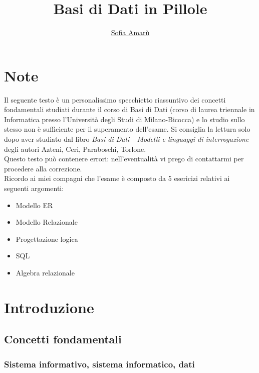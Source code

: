 \documentclass[a4paper]{article}
\begin{document}
\title{Basi di Dati in Pillole}
\author{\href{https://t.me/amarusofia}{Sofia Amarù}}
\maketitle
\tableofcontents

\section*{Note}
Il seguente testo è un personalissimo specchietto riassuntivo dei concetti fondamentali studiati durante il corso di Basi di Dati (corso di laurea triennale in Informatica presso l'Università degli Studi di Milano-Bicocca) e lo studio sullo stesso non è sufficiente per il superamento dell'esame. Si consiglia la lettura solo dopo aver studiato dal libro \emph{Basi di Dati - Modelli e linguaggi di interrogazione} degli autori Azteni, Ceri, Paraboschi, Torlone.\medskip\\
Questo testo può contenere errori: nell'eventualità vi prego di contattarmi per procedere alla correzione.\medskip\\
%
Ricordo ai miei compagni che l'esame è composto da 5 esericizi relativi ai seguenti argomenti:
\begin{itemize}[leftmargin=*, noitemsep]
  \item Modello ER
  \item Modello Relazionale
  \item Progettazione logica
  \item SQL
  \item Algebra relazionale
\end{itemize}

\section{Introduzione}
\subsection{Concetti fondamentali}
\subsubsection{Sistema informativo, sistema informatico, dati}
\end{document}

